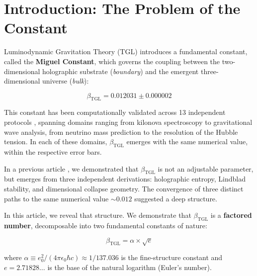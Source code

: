 \documentclass[12pt,a4paper,twoside]{article}
\newcommand{\betatgl}{\beta_{\!\scriptscriptstyle\mathrm{TGL}}}
\newcommand{\boundary}{\textit{boundary}}
\newcommand{\bulk}{\textit{bulk}}
\begin{document}
\tableofcontents
\newpage


\section{Introduction: The Problem of the Constant}

Luminodynamic Gravitation Theory (TGL) \cite{Miguel2026Fronteira, Miguel2026LastString} introduces a fundamental constant, called the \textbf{Miguel Constant}, which governs the coupling between the two-dimensional holographic substrate (\boundary) and the emergent three-dimensional universe (\bulk):

\begin{equation}
\betatgl = 0.012031 \pm 0.000002
\label{eq:betatgl_value}
\end{equation}

This constant has been computationally validated across 13 independent protocols \cite{Miguel2026GitHub}, spanning domains ranging from kilonova spectroscopy to gravitational wave analysis, from neutrino mass prediction to the resolution of the Hubble tension. In each of these domains, $\betatgl$ emerges with the same numerical value, within the respective error bars.

In a previous article \cite{Miguel2025Alpha2}, we demonstrated that $\betatgl$ is not an adjustable parameter, but emerges from three independent derivations: holographic entropy, Lindblad stability, and dimensional collapse geometry. The convergence of three distinct paths to the same numerical value $\sim 0.012$ suggested a deep structure.

In this article, we reveal that structure. We demonstrate that $\betatgl$ is a \textbf{factored number}, decomposable into two fundamental constants of nature:

\begin{equationbox}[title={The Factorization}]
\begin{equation}
\boxed{\betatgl = \alpha \times \sqrt{e}}
\label{eq:fatoracao}
\end{equation}
\end{equationbox}

\noindent where $\alpha \equiv e_0^2 / (4\pi\epsilon_0 \hbar c) \approx 1/137.036$ is the fine-structure constant and $e = 2.71828\ldots$ is the base of the natural logarithm (Euler's number).
\end{document}

